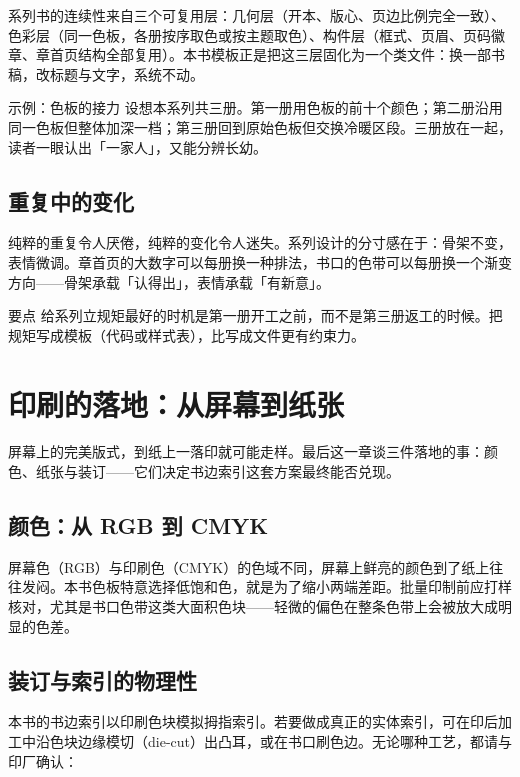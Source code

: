 \documentclass{bookedge}
\begin{document}
系列书的连续性来自三个可复用层：几何层（开本、版心、页边比例完全一致）、色彩层（同一色板，各册按序取色或按主题取色）、构件层（框式、页眉、页码徽章、章首页结构全部复用）。本书模板正是把这三层固化为一个类文件：换一部书稿，改标题与文字，系统不动。

\begin{examplebox}{示例：色板的接力}
设想本系列共三册。第一册用色板的前十个颜色；第二册沿用同一色板但整体加深一档；第三册回到原始色板但交换冷暖区段。三册放在一起，读者一眼认出「一家人」，又能分辨长幼。
\end{examplebox}

\section{重复中的变化}

纯粹的重复令人厌倦，纯粹的变化令人迷失。系列设计的分寸感在于：骨架不变，表情微调。章首页的大数字可以每册换一种排法，书口的色带可以每册换一个渐变方向——骨架承载「认得出」，表情承载「有新意」。

\begin{notebox}{要点}
给系列立规矩最好的时机是第一册开工之前，而不是第三册返工的时候。把规矩写成模板（代码或样式表），比写成文件更有约束力。
\end{notebox}

\chapter{印刷的落地：从屏幕到纸张}

屏幕上的完美版式，到纸上一落印就可能走样。最后这一章谈三件落地的事：颜色、纸张与装订——它们决定书边索引这套方案最终能否兑现。

\section{颜色：从 RGB 到 CMYK}

屏幕色（RGB）与印刷色（CMYK）的色域不同，屏幕上鲜亮的颜色到了纸上往往发闷。本书色板特意选择低饱和色，就是为了缩小两端差距。批量印制前应打样核对，尤其是书口色带这类大面积色块——轻微的偏色在整条色带上会被放大成明显的色差。

\section{装订与索引的物理性}

本书的书边索引以印刷色块模拟拇指索引。若要做成真正的实体索引，可在印后加工中沿色块边缘模切（die-cut）出凸耳，或在书口刷色边。无论哪种工艺，都请与印厂确认：
\end{document}
